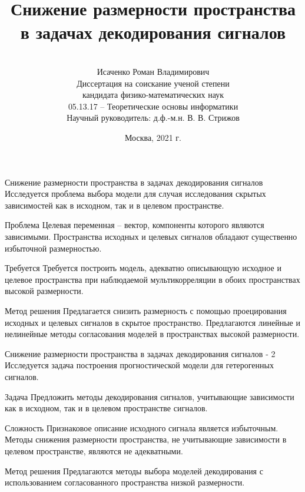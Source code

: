 \documentclass[10pt]{beamer}
\title[\hbox to 56mm{  \hfill\insertframenumber\,/\,\inserttotalframenumber}]
{\\ Снижение размерности пространства \\ в задачах декодирования сигналов}
\author[Роман Исаченко]{\\ 
	Исаченко Роман Владимирович \\
	\vspace{3mm}
	{\footnotesize 
	Диссертация на соискание ученой степени \\
	кандидата физико-математических наук
	} \\
	\vspace{0.2cm}
	{\footnotesize05.13.17 -- Теоретические основы информатики} \\
	\vspace{0.2cm}
	{\footnotesize Научный руководитель: д.ф.-м.н. В. В. Стрижов}
	}
\date{Москва, 2021 г.}
\begin{document}
\begin{frame}
\titlepage
\end{frame}
\begin{frame}{Снижение размерности пространства в задачах декодирования сигналов}
	Исследуется проблема выбора модели для случая исследования скрытых зависимостей как в исходном, так и в целевом пространстве.
	\begin{block}{Проблема}
		Целевая переменная -- вектор, компоненты которого являются зависимыми. 
		Пространства исходных и целевых сигналов обладают существенно избыточной размерностью. 
	\end{block}
	
	\begin{block}{Требуется}
		Требуется построить модель, адекватно описывающую исходное и целевое пространства при наблюдаемой мультикорреляции в обоих пространствах высокой размерности.
	\end{block}
	
	\begin{block}{Метод решения}
		Предлагается снизить размерность с помощью проецирования исходных и целевых сигналов в скрытое пространство. Предлагаются линейные и нелинейные методы согласования моделей в пространствах высокой размерности.	
	\end{block}
\end{frame}
\begin{frame}{Снижение размерности пространства в задачах декодирования сигналов - 2}
	Исследуется задача построения прогностической модели для гетерогенных сигналов.
	\begin{block}{Задача}
		Предложить методы декодирования сигналов, учитывающие зависимости как в исходном, так и в целевом пространстве сигналов.
	\end{block}
	
	 \begin{block}{Сложность}
	 	Признаковое описание исходного сигнала является избыточным. Методы снижения размерности пространства, не учитывающие зависимости в целевом пространстве, являются не адекватными.
	 \end{block}

	\begin{block}{Метод решения}
		Предлагаются методы выбора моделей декодирования с использованием согласованного пространства низкой размерности.
	\end{block}
\end{frame}
\end{document}
